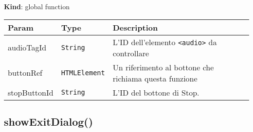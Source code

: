 \textbf{Kind}: global function

\begin{tabularx}{\textwidth}{XXX}
\toprule
\begin{minipage}[b]{0.30\columnwidth}\raggedright
Param\strut
\end{minipage} & \begin{minipage}[b]{0.30\columnwidth}\raggedright
Type\strut
\end{minipage} & \begin{minipage}[b]{0.30\columnwidth}\raggedright
Description\strut
\end{minipage}\tabularnewline
\midrule
\endhead
\begin{minipage}[t]{0.30\columnwidth}\raggedright
audioTagId\strut
\end{minipage} & \begin{minipage}[t]{0.30\columnwidth}\raggedright
\texttt{String}\strut
\end{minipage} & \begin{minipage}[t]{0.30\columnwidth}\raggedright
L'ID dell'elemento \texttt{\textless{}audio\textgreater{}} da
controllare\strut
\end{minipage}\tabularnewline
\begin{minipage}[t]{0.30\columnwidth}\raggedright
buttonRef\strut
\end{minipage} & \begin{minipage}[t]{0.30\columnwidth}\raggedright
\texttt{HTMLElement}\strut
\end{minipage} & \begin{minipage}[t]{0.30\columnwidth}\raggedright
Un riferimento al bottone che richiama questa funzione\strut
\end{minipage}\tabularnewline
\begin{minipage}[t]{0.30\columnwidth}\raggedright
stopButtonId\strut
\end{minipage} & \begin{minipage}[t]{0.30\columnwidth}\raggedright
\texttt{String}\strut
\end{minipage} & \begin{minipage}[t]{0.30\columnwidth}\raggedright
L'ID del bottone di Stop.\strut
\end{minipage}\tabularnewline
\bottomrule
\end{tabularx}

\protect\hypertarget{showExitDialog}{}{}

\hypertarget{showexitdialog}{%
\subsection{showExitDialog()}\label{showexitdialog}}

